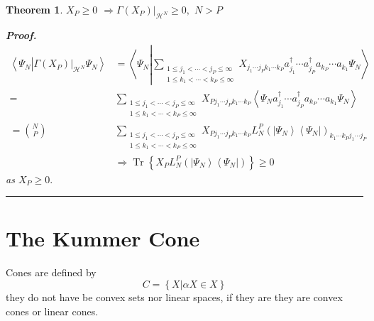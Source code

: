 \documentclass[aps,preprint]{revtex4}%
\newtheorem{theorem}{Theorem}
\newenvironment{proof}[1][Proof]{\noindent\textbf{#1.} }{\ \rule{0.5em}{0.5em}}
\begin{document}
\begin{theorem}
$X_{P}\geq0$ $\Rightarrow\left.  \Gamma\left(  X_{P}\right)  \right\vert
_{\mathcal{H}^{N}}\geq0,$ $N>P$

\begin{proof}%
\begin{align}
\left\langle \Psi_{N}\left\vert \left.  \Gamma\left(  X_{P}\right)
\right\vert _{\mathcal{H}^{N}}\right.  \Psi_{N}\right\rangle  &  =\left\langle
\Psi_{N}\left\vert \sum_{\substack{1\leq j_{1}<\cdots<j_{P}\leq\infty\\1\leq
k_{1}<\cdots<k_{P}\leq\infty}}X_{j_{1}\cdots j_{P}k_{1}\cdots k_{P}}a_{j_{1}%
}^{\dagger}\cdots a_{j_{P}}^{\dagger}a_{k_{P}}\cdots a_{k_{1}}\right.
\Psi_{N}\right\rangle \nonumber\\
=  &  \sum_{\substack{1\leq j_{1}<\cdots<j_{P}\leq\infty\\1\leq k_{1}%
<\cdots<k_{P}\leq\infty}}X_{Pj_{1}\cdots j_{P}k_{1}\cdots k_{P}}\left\langle
\Psi_{N}a_{j_{1}}^{\dagger}\cdots a_{j_{P}}^{\dagger}a_{k_{P}}\cdots a_{k_{1}%
}\Psi_{N}\right\rangle \nonumber\\
=\binom{N}{P}  &  \sum_{\substack{1\leq j_{1}<\cdots<j_{P}\leq\infty\\1\leq
k_{1}<\cdots<k_{P}\leq\infty}}X_{Pj_{1}\cdots j_{P}k_{1}\cdots k_{P}}L_{N}%
^{P}\left(  \left\vert \Psi_{N}\right\rangle \left\langle \Psi_{N}\right\vert
\right)  _{k_{1}\cdots k_{P}j_{1}\cdots j_{P}}\nonumber\\
&  \Rightarrow\operatorname{Tr}\left\{  X_{P}L_{N}^{P}\left(  \left\vert
\Psi_{N}\right\rangle \left\langle \Psi_{N}\right\vert \right)  \right\}
\geq0
\end{align}
as $X_{P}\geq0.$
\end{proof}
\end{theorem}

\section{The Kummer Cone}

Cones are defined by
\begin{equation}
C=\left\{  \left.  X\right\vert \alpha X\in X\right\}
\end{equation}
they do not have be convex sets nor linear spaces, if they are they are convex
cones or linear cones.
\end{document}
